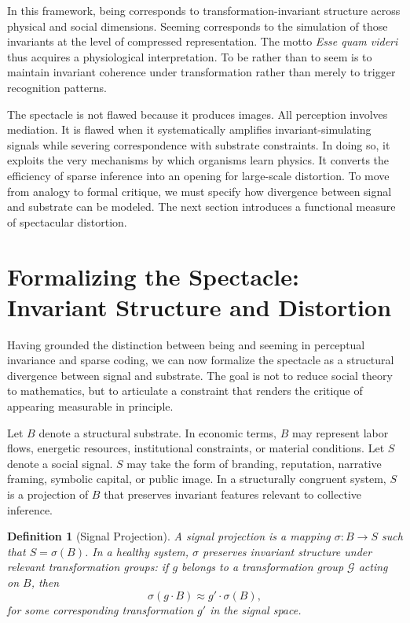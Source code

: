 \documentclass[11pt]{article}
\newtheorem{definition}{Definition}
\begin{document}
In this framework, being corresponds to transformation-invariant structure across physical and social dimensions. Seeming corresponds to the simulation of those invariants at the level of compressed representation. The motto \textit{Esse quam videri} thus acquires a physiological interpretation. To be rather than to seem is to maintain invariant coherence under transformation rather than merely to trigger recognition patterns.

The spectacle is not flawed because it produces images. All perception involves mediation. It is flawed when it systematically amplifies invariant-simulating signals while severing correspondence with substrate constraints. In doing so, it exploits the very mechanisms by which organisms learn physics. It converts the efficiency of sparse inference into an opening for large-scale distortion. To move from analogy to formal critique, we must specify how divergence between signal and substrate can be modeled. The next section introduces a functional measure of spectacular distortion.

\section{Formalizing the Spectacle: Invariant Structure and Distortion}

Having grounded the distinction between being and seeming in perceptual invariance and sparse coding, we can now formalize the spectacle as a structural divergence between signal and substrate. The goal is not to reduce social theory to mathematics, but to articulate a constraint that renders the critique of appearing measurable in principle.

Let $B$ denote a structural substrate. In economic terms, $B$ may represent labor flows, energetic resources, institutional constraints, or material conditions. Let $S$ denote a social signal. $S$ may take the form of branding, reputation, narrative framing, symbolic capital, or public image. In a structurally congruent system, $S$ is a projection of $B$ that preserves invariant features relevant to collective inference.

\begin{definition}[Signal Projection]
A signal projection is a mapping $\sigma : B \to S$ such that $S = \sigma(B)$. In a healthy system, $\sigma$ preserves invariant structure under relevant transformation groups: if $g$ belongs to a transformation group $\mathcal{G}$ acting on $B$, then
\[
\sigma(g \cdot B) \approx g' \cdot \sigma(B),
\]
for some corresponding transformation $g'$ in the signal space.
\end{definition}
\end{document}
